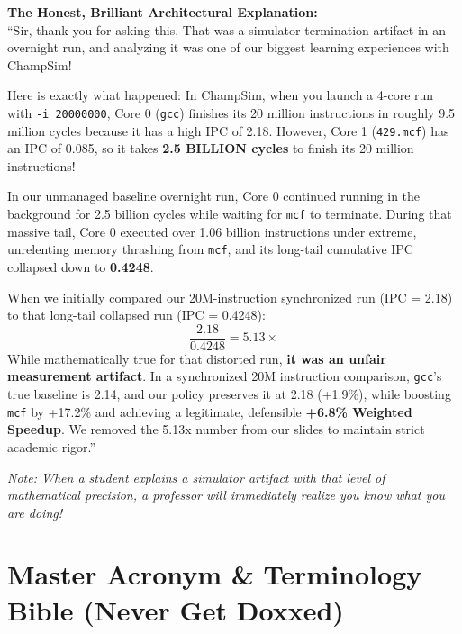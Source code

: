 \documentclass[11pt, a4paper]{article}
\begin{document}
\begin{answerbox}
\textbf{The Honest, Brilliant Architectural Explanation:}\\
``Sir, thank you for asking this. That was a simulator termination artifact in an overnight run, and analyzing it was one of our biggest learning experiences with ChampSim! 

Here is exactly what happened: In ChampSim, when you launch a 4-core run with \texttt{-i 20000000}, Core 0 (\texttt{gcc}) finishes its 20 million instructions in roughly 9.5 million cycles because it has a high IPC of 2.18. However, Core 1 (\texttt{429.mcf}) has an IPC of 0.085, so it takes \textbf{2.5 BILLION cycles} to finish its 20 million instructions!

In our unmanaged baseline overnight run, Core 0 continued running in the background for 2.5 billion cycles while waiting for \texttt{mcf} to terminate. During that massive tail, Core 0 executed over 1.06 billion instructions under extreme, unrelenting memory thrashing from \texttt{mcf}, and its long-tail cumulative IPC collapsed down to \textbf{0.4248}.

When we initially compared our 20M-instruction synchronized run (IPC = 2.18) to that long-tail collapsed run (IPC = 0.4248):
\begin{equation}
  \frac{2.18}{0.4248} = 5.13\times
\end{equation}
While mathematically true for that distorted run, \textbf{it was an unfair measurement artifact}. In a synchronized 20M instruction comparison, \texttt{gcc}'s true baseline is 2.14, and our policy preserves it at 2.18 (+1.9\%), while boosting \texttt{mcf} by +17.2\% and achieving a legitimate, defensible \textbf{+6.8\% Weighted Speedup}. We removed the 5.13x number from our slides to maintain strict academic rigor.''
\end{answerbox}

\noindent\textit{Note: When a student explains a simulator artifact with that level of mathematical precision, a professor will immediately realize you know what you are doing!}

\newpage

\section{Master Acronym \& Terminology Bible (Never Get Doxxed)}
\end{document}
